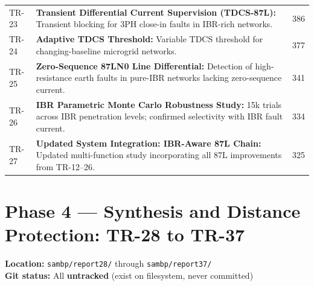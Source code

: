 \documentclass[11pt,a4paper]{article}
\begin{document}
\begin{longtable}{lp{9.5cm}l}
TR-23 & \textbf{Transient Differential Current Supervision (TDCS-87L):} Transient blocking for 3PH close-in faults in IBR-rich networks. & 386 \\[3pt]
TR-24 & \textbf{Adaptive TDCS Threshold:} Variable TDCS threshold for changing-baseline microgrid networks. & 377 \\[3pt]
TR-25 & \textbf{Zero-Sequence 87LN0 Line Differential:} Detection of high-resistance earth faults in pure-IBR networks lacking zero-sequence current. & 341 \\[3pt]
TR-26 & \textbf{IBR Parametric Monte Carlo Robustness Study:} 15k trials across IBR penetration levels; confirmed selectivity with IBR fault current. & 334 \\[3pt]
TR-27 & \textbf{Updated System Integration: IBR-Aware 87L Chain:} Updated multi-function study incorporating all 87L improvements from TR-12--26. & 325 \\[3pt]
\bottomrule
\end{longtable}

\section{Phase 4 — Synthesis and Distance Protection: TR-28 to TR-37}

\begin{phasebox}
\textbf{Location:} \texttt{sambp/report28/} through \texttt{sambp/report37/}\\
\textbf{Git status:} All \textcolor{untrackedorange}{\textbf{untracked}} (exist on filesystem, never committed)
\end{phasebox}
\end{document}

